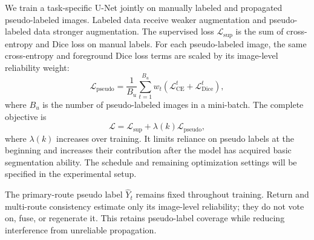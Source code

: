 \documentclass[a4paper,fleqn]{cas-dc}
\begin{document}
We train a task-specific U-Net jointly on manually labeled and propagated pseudo-labeled images. Labeled data receive weaker augmentation and pseudo-labeled data stronger augmentation. The supervised loss $\mathcal{L}_{\mathrm{sup}}$ is the sum of cross-entropy and Dice loss on manual labels. For each pseudo-labeled image, the same cross-entropy and foreground Dice loss terms are scaled by its image-level reliability weight:
\begin{equation}
\mathcal{L}_{\mathrm{pseudo}}=
\frac{1}{B_u}\sum_{t=1}^{B_u}w_t
\left(\mathcal{L}_{\mathrm{CE}}^{t}
+\mathcal{L}_{\mathrm{Dice}}^{t}\right),
\end{equation}
where $B_u$ is the number of pseudo-labeled images in a mini-batch. The complete objective is
\begin{equation}
\mathcal{L}=\mathcal{L}_{\mathrm{sup}}
+\lambda(k)\mathcal{L}_{\mathrm{pseudo}},
\end{equation}
where $\lambda(k)$ increases over training. It limits reliance on pseudo labels at the beginning and increases their contribution after the model has acquired basic segmentation ability. The schedule and remaining optimization settings will be specified in the experimental setup.

The primary-route pseudo label $\widehat{Y}_t$ remains fixed throughout training. Return and multi-route consistency estimate only its image-level reliability; they do not vote on, fuse, or regenerate it. This retains pseudo-label coverage while reducing interference from unreliable propagation.



\end{document}

